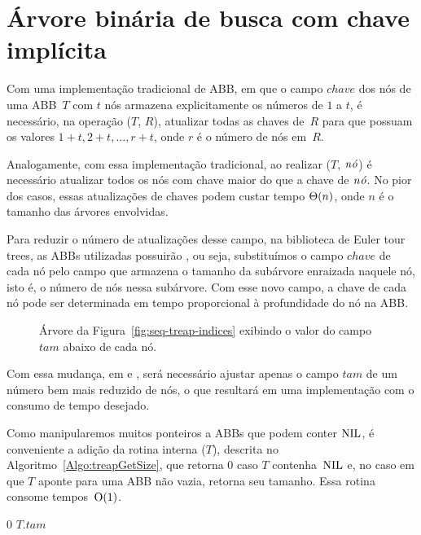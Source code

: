 \chapter{Árvore binária de busca com chave implícita}
\label{sec:TreapDeChaveImplicita}

Com uma implementação tradicional de ABB, em que o campo $chave$ dos nós de uma ABB~$T$ com $t$ nós armazena explicitamente os números de $1$ a $t$, é necessário, na operação \treapJoin($T$, $R$), atualizar todas as chaves de~$R$ para que possuam os valores $1+t,2+t, \ldots, r+t$, onde $r$ é o número de nós em~$R$.

Analogamente, com essa implementação tradicional, ao realizar \treapSplit($T$, $\mathit{n\acute{o}}$) é necessário atualizar todos os nós com chave maior do que a chave de $\mathit{n\acute{o}}$.
No pior dos casos, essas atualizações de chaves podem custar tempo $\Theta(n)$, onde $n$ é o tamanho das árvores envolvidas.

Para reduzir o número de atualizações desse campo, na biblioteca de Euler tour trees, as ABBs utilizadas possuirão , ou seja, substituímos o campo $chave$ de cada nó pelo campo  que armazena o tamanho da subárvore enraizada naquele nó, isto é, o número de nós nessa subárvore.
Com esse novo campo, a chave de cada nó pode ser determinada em tempo proporcional à profundidade do nó na ABB.

\begin{figure}[htb]
\centering

\caption{Árvore da Figura~\ref{fig:seq-treap-indices} exibindo o valor do campo $tam$ abaixo de cada nó.}
\label{fig:seq-treap-size}
\end{figure}

\newpage
Com essa mudança, em \treapJoin{} e \treapSplit{}, será necessário ajustar apenas o campo $tam$ de um número bem mais reduzido de nós, o que resultará em uma implementação com o consumo de tempo desejado.

Como manipularemos muitos ponteiros a ABBs que podem conter $\text{NIL}$, é conveniente a adição da rotina interna \treapGetSize($T$), descrita no Algoritmo~\ref{Algo:treapGetSize}, que retorna $0$ caso $T$ contenha~$\text{NIL}$ e, no caso em que $T$ aponte para uma ABB não vazia, retorna seu tamanho. Essa rotina consome tempos~$\mathrm{O}(1)$.

\begin{algorithm}[!htb]
\caption{\treapGetSize($T$)}
\label{Algo:treapGetSize}
\begin{algorithmic}[1]
\State \Return $0$
\EndIf
\State \Return $T$.$tam$
\end{algorithmic}
\end{algorithm}

